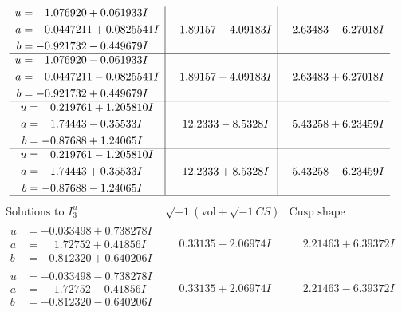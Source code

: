 \documentclass[1p]{elsarticle_modified}
\theoremstyle{definition}
\newcommand{\I}{\sqrt{-1}}
\begin{document}
$$\begin{array}{c|c|c}
\begin{aligned}
u &= \phantom{-}1.076920 + 0.061933 I \\
a &= \phantom{-}0.0447211 + 0.0825541 I \\
b &= -0.921732 - 0.449679 I\end{aligned}
 & \phantom{-}1.89157 + 4.09183 I & \phantom{-}2.63483 - 6.27018 I \\ \hline\begin{aligned}
u &= \phantom{-}1.076920 - 0.061933 I \\
a &= \phantom{-}0.0447211 - 0.0825541 I \\
b &= -0.921732 + 0.449679 I\end{aligned}
 & \phantom{-}1.89157 - 4.09183 I & \phantom{-}2.63483 + 6.27018 I \\ \hline\begin{aligned}
u &= \phantom{-}0.219761 + 1.205810 I \\
a &= \phantom{-}1.74443 - 0.35533 I \\
b &= -0.87688 + 1.24065 I\end{aligned}
 & \phantom{-}12.2333 - 8.5328 I & \phantom{-}5.43258 + 6.23459 I \\ \hline\begin{aligned}
u &= \phantom{-}0.219761 - 1.205810 I \\
a &= \phantom{-}1.74443 + 0.35533 I \\
b &= -0.87688 - 1.24065 I\end{aligned}
 & \phantom{-}12.2333 + 8.5328 I & \phantom{-}5.43258 - 6.23459 I\\
 \hline 
 \end{array}$$\newpage$$\begin{array}{c|c|c}  
\text{Solutions to }I^u_{3}& \I (\text{vol} + \sqrt{-1}CS) & \text{Cusp shape}\\
 \hline 
\begin{aligned}
u &= -0.033498 + 0.738278 I \\
a &= \phantom{-}1.72752 + 0.41856 I \\
b &= -0.812320 + 0.640206 I\end{aligned}
 & \phantom{-}0.33135 - 2.06974 I & \phantom{-}2.21463 + 6.39372 I \\ \hline\begin{aligned}
u &= -0.033498 - 0.738278 I \\
a &= \phantom{-}1.72752 - 0.41856 I \\
b &= -0.812320 - 0.640206 I\end{aligned}
 & \phantom{-}0.33135 + 2.06974 I & \phantom{-}2.21463 - 6.39372 I \\ \hline\begin{aligned}

\end{aligned}
\end{array}$$
\end{document}
